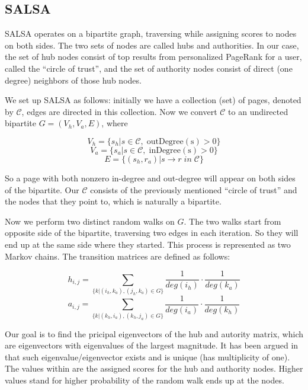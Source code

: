 \documentclass[12pt]{article}
\begin{document}
\subsection{SALSA}

SALSA \cite{salsa} operates on a bipartite graph, traversing while assigning scores to nodes on both sides. The two sets of nodes are called hubs and authorities. In our case, the set of hub nodes consist of top results from personalized PageRank for a user, called the ``circle of trust'', and the set of authority nodes consist of direct (one degree) neighbors of those hub nodes.

We set up SALSA as follows: initially we have a collection (set) of pages, denoted by $\mathcal{C}$, edges are directed in this collection. Now we convert $\mathcal{C}$ to an undirected bipartite $G = (V_h, V_a, E)$, where

\[V_h = \{ s_h | s \in \mathcal{C}, \; \mathrm{outDegree(s)} > 0 \}\]
\[V_a = \{ s_a | s \in \mathcal{C}, \; \mathrm{inDegree(s)} > 0 \}\]
\[E = \{ (s_h, r_a) | s \rightarrow r \; in \; \mathcal{C} \}\]

So a page with both nonzero in-degree and out-degree will appear on both sides of the bipartite. Our $\mathcal{C}$ consists of the previously mentioned ``circle of trust'' and the nodes that they point to, which is naturally a bipartite.

Now we perform two distinct random walks on $G$. The two walks start from opposite side of the bipartite, traversing two edges in each iteration. So they will end up at the same side where they started. This process is represented as two Markov chains. The transition matrices are defined as follows:

\[h_{i,j} = \sum_{\{k | (i_h, k_a), (j_h, k_a) \in G\}}{\frac{1}{deg(i_h)} \cdot \frac{1}{deg(k_a)}}\]
\[a_{i,j} = \sum_{\{k | (k_h, i_a), (k_h, j_a) \in G\}}{\frac{1}{deg(i_a)} \cdot \frac{1}{deg(k_h)}}\]

Our goal is to find the pricipal eigenvectors of the hub and autority matrix, which are eigenvectors with eigenvalues of the largest magnitude. It has been argued in \cite{salsa} that such eigenvalue/eigenvector exists and is unique (has multiplicity of one). The values within are the assigned scores for the hub and authority nodes. Higher values stand for higher probability of the random walk ends up at the nodes.

\printbibliography
\end{document}
